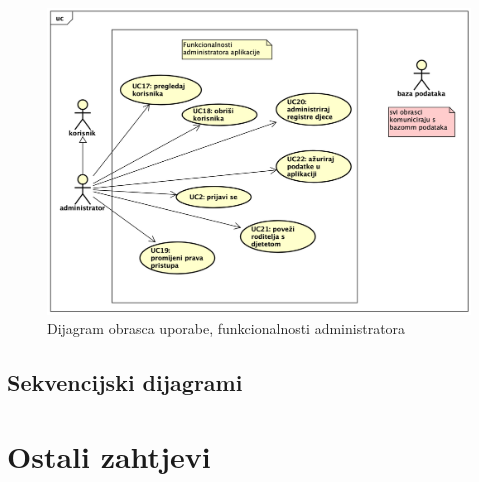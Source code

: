 					\begin{figure}[H]
						\includegraphics[width=\textwidth]{slike/uc_admin.png} 
						\caption{Dijagram obrasca uporabe, funkcionalnosti administratora}
						\label{fig:promjene2} 
			\end{figure}
				\eject		
				
			\subsection{Sekvencijski dijagrami}
				
				
    
				\eject
	
		\section{Ostali zahtjevi}
		
		 
			 
			 
			 
	